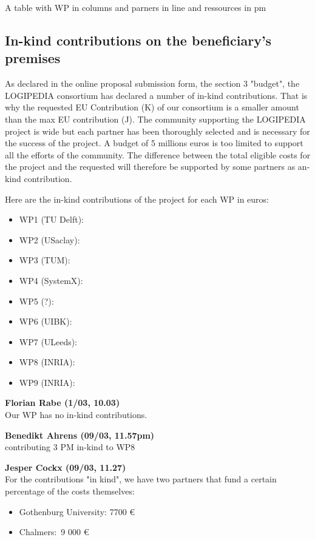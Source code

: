 {\color{red} A table with WP in columns and parners in line and
  ressources in pm}

\subsection{In-kind contributions on the beneficiary's premises}

As declared in the online proposal submission form, the section 3 "budget", the LOGIPEDIA consortium has declared a number of in-kind contributions. That is why the requested EU Contribution (K) of our consortium is a smaller amount than the max EU contribution (J). The community supporting the LOGIPEDIA project is wide but each partner has been thoroughly selected and is necessary for the success of the project. A budget of 5 millions euros is too limited to support all the efforts of the community. The difference between the total eligible costs for the project and the requested will therefore be supported by some partners as an-kind contribution.

Here are the in-kind contributions of the project for each WP in euros:

\begin{itemize}
\item WP1 (TU Delft):
\item WP2 (USaclay):
\item WP3 (TUM):
\item WP4 (SystemX):
\item WP5 (?):
\item WP6 (UIBK):
\item WP7 (ULeeds):
\item WP8 (INRIA):
\item WP9 (INRIA):
\end{itemize}

\textbf{Florian Rabe (1/03, 10.03)}\\
Our WP has no in-kind contributions.

\textbf{Benedikt Ahrens (09/03, 11.57pm)}\\
contributing 3 PM in-kind to WP8

\textbf{Jesper Cockx (09/03, 11.27)}\\
For the contributions "in kind", we have two partners that fund a certain percentage of the costs themselves:
\begin{itemize}
\item Gothenburg University: 7700 €
\item Chalmers: 9 000 €
\end{itemize}

